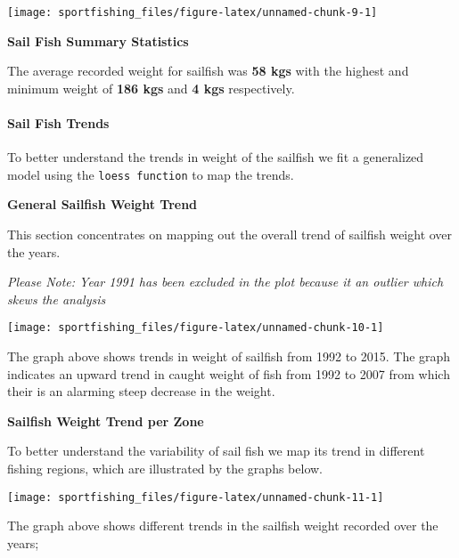 \documentclass[
]{article}
\begin{document}
\begin{center}\texttt{[image: sportfishing\_files/figure-latex/unnamed-chunk-9-1]} \end{center}

\textbf{Sail Fish Summary Statistics}

The average recorded weight for sailfish was \textbf{58 kgs} with the
highest and minimum weight of \textbf{186 kgs} and \textbf{4 kgs}
respectively.

\newpage

\paragraph{Sail Fish Trends}\label{sail-fish-trends}

To better understand the trends in weight of the sailfish we fit a
generalized model using the \texttt{loess\ function} to map the trends.

\textbf{General Sailfish Weight Trend}

This section concentrates on mapping out the overall trend of sailfish
weight over the years.

\emph{Please Note: Year 1991 has been excluded in the plot because it an
outlier which skews the analysis}

\begin{center}\texttt{[image: sportfishing\_files/figure-latex/unnamed-chunk-10-1]} \end{center}

The graph above shows trends in weight of sailfish from 1992 to 2015.
The graph indicates an upward trend in caught weight of fish from 1992
to 2007 from which their is an alarming steep decrease in the weight.

\newpage

\textbf{Sailfish Weight Trend per Zone}

To better understand the variability of sail fish we map its trend in
different fishing regions, which are illustrated by the graphs below.

\begin{center}\texttt{[image: sportfishing\_files/figure-latex/unnamed-chunk-11-1]} \end{center}

The graph above shows different trends in the sailfish weight recorded
over the years;
\end{document}
